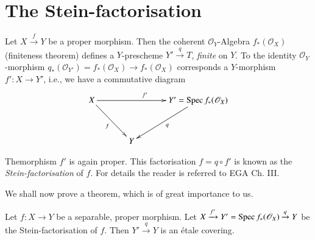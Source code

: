 \section{The Stein-factorisation}\label{chap6-sec6.2}

Let $X\xrightarrow{f}Y$ be a proper morphism. Then the coherent
$\mathscr{O}_{Y}$-Algebra $f_{\ast}(\mathscr{O}_{X})$ (finiteness
theorem) defines a $Y$-prescheme $Y'\xrightarrow{q}T$, {\em finite} on
$Y$. To the identity $\mathscr{O}_{Y}$-morphism
$q_{\ast}(\mathscr{O}_{Y'})=f_{\ast}(\mathscr{O}_{X})\to
f_{\ast}(\mathscr{O}_{X})$ corresponds a $Y$-morphism $f':X\to Y'$,
i.e., we have a commutative diagram
\[
\xymatrix@=1.2cm{
X\ar[dr]_{f}\ar[rr]^{f'} & & Y'=\Spec f_{\ast}(\mathscr{O}_{X})\ar[dl]^{q}\\
 & Y &
}
\]

The\pageoriginale morphism $f'$ is again proper. This factorisation
$f=q\circ f'$ is known as the {\em Stein-factorisation} of $f$. For
details the reader is referred to EGA Ch. III.

We shall now prove a theorem, which is of great importance to us.

\begin{theorem}\label{chap6-thm6.2.1}
Let $f:X\to Y$ be a separable, proper morphism. Let
$X\xrightarrow{f'}Y'=\operatorname{Spec} f_{\ast}(\mathscr{O}_{X})\xrightarrow{q}Y$
be the Stein-factorisation of $f$. Then $Y'\xrightarrow{q}Y$ is an
\'etale covering.
\end{theorem}


